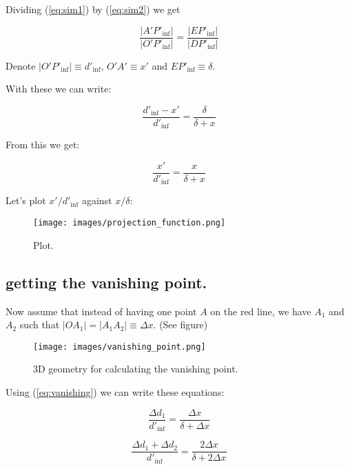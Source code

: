 \documentclass{article}
\begin{document}
Dividing (\ref{eq:sim1}) by (\ref{eq:sim2}) we get

\begin{equation}
    \frac{|A'P'_{\text{inf}}|}{|O'P'_{\text{inf}}|} = \frac{|EP'_{\text{inf}}|}{|DP'_{\text{inf}}|}
\end{equation}

Denote $|O'P'_{\text{inf}}| \equiv d'_{\inf}$, $O'A' \equiv x'$ and $EP'_{\text{inf}} \equiv \delta$.

With these we can write:

\begin{equation}
    \frac{d'_{\text{inf}} - x'}{d'_{\text{inf}}} = \frac{\delta}{\delta + x}
\end{equation}

From this we get:

\begin{equation} \label{eq:vanishing}
    \boxed{\frac{x'}{d'_{\text{inf}}} = \frac{x}{\delta + x}}
\end{equation}


Let's plot $x'/d'_{\text{inf}}$ against $x/\delta$:

\begin{figure}[ht]
 \centering
  \texttt{[image: images/projection\_function.png]}
 \caption{Plot.}
\end{figure}

\subsection{getting the vanishing point.}

Now assume that instead of having one point $A$ on the red line, we have $A_1$ and $A_2$ such that $|OA_1| = |A_1A_2| \equiv \Delta x$. (See figure)

\begin{figure}[ht]
 \centering
  \texttt{[image: images/vanishing\_point.png]}
 \caption{3D geometry for calculating the vanishing point.}
\end{figure}

Using (\ref{eq:vanishing}) we can write these equations:

\begin{equation}
    \frac{\Delta d_1}{d'_{\text{inf}}} = \frac{\Delta x}{\delta + \Delta x}
\end{equation}

\begin{equation}
    \frac{\Delta d_1 + \Delta d_2}{d'_{\text{inf}}} = \frac{2\Delta x}{\delta + 2\Delta x}
\end{equation}
\end{document}
